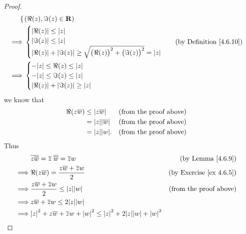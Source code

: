 \begin{proof}
\begin{align*}
\begin{cases}
        \end{cases} & (\Re(z), \Im(z) \in \mathbf{R})     \\
        \implies & \begin{cases}
            \abs*{\Re(z)} \leq \abs*{z} \\
            \abs*{\Im(z)} \leq \abs*{z} \\
            \abs*{\Re(z)} + \abs*{\Im(z)} \geq \sqrt{\big(\Re(z)\big)^2 + \big(\Im(z)\big)^2} = \abs*{z}
        \end{cases} & \text{(by Definition \ref{4.6.10})} \\
        \implies & \begin{cases}
            -\abs*{z} \leq \Re(z) \leq \abs*{z} \\
            -\abs*{z} \leq \Im(z) \leq \abs*{z} \\
            \abs*{\Re(z)} + \abs*{\Im(z)} \geq \abs*{z}
        \end{cases}
    \end{align*}
    we know that
    \begin{align*}
        \Re(z \overline{w}) & \leq \abs*{z \overline{w}}     & \text{(from the proof above)} \\
                            & = \abs*{z} \abs*{\overline{w}} & \text{(from the proof above)} \\
                            & = \abs*{z} \abs*{w}.           & \text{(from the proof above)}
    \end{align*}
    Thus
    \begin{align*}
                 & \overline{z \overline{w}} = \overline{z} \; \overline{\overline{w}} = \overline{z} w                         & \text{(by Lemma \ref{4.6.9})}                     \\
        \implies & \Re(z \overline{w}) = \frac{z \overline{w} + \overline{z} w}{2}                                              & \text{(by Exercise \ref{ex 4.6.5})}               \\
        \implies & \frac{z \overline{w} + \overline{z} w}{2} \leq \abs*{z} \abs*{w}                                             & \text{(from the proof above)}                     \\
        \implies & z \overline{w} + \overline{z} w \leq 2 \abs*{z} \abs*{w}                                                                                                         \\
        \implies & \abs*{z}^2 + z \overline{w} + \overline{z} w + \abs*{w}^2 \leq \abs*{z}^2 + 2 \abs*{z} \abs*{w} + \abs*{w}^2                                                     \\

\end{align*}
\end{proof}
